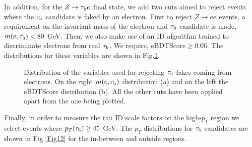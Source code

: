 In addition, for the $Z\to\tau_\text{h} e$ final state, we add two cuts aimed to reject events where the $\tau_\text{h}$ candidate is faked by an electron. First to reject $Z\to ee$ events, a requirement on the invariant mass of the electron and $\tau_\text{h}$ candidate is made, $m(e,\tau_\text{h})<80$ GeV. Then, we also make use of an ID algorithm trained to discriminate electrons from real $\tau_\text{h}$. We require, eBDTScore$\geq 0.06$. The distributions for these variables are shown in Fig.\ref{Fig11}.
\begin{figure}[ht]
	\centering
	\hfill
	\caption{Distribution of the variables used for rejecting $\tau_\text{h}$ fakes coming from electrons. On the right $m(e,\tau_\text{h})$ distribution (a) and on the left the eBDTScore distribution (b). All the other cuts have been applied apart from the one being plotted.}
	\label{Fig11}
\end{figure}
Finally, in order to measure the tau ID scale factors on the high-$p_T$ region we select events where $p_T(\tau_\text{h})\geq 45$ GeV. The $p_T$ distributions for $\tau_\text{h}$ candidates are shown in Fig.\ref{Fig12} for the in-between and outside regions.
